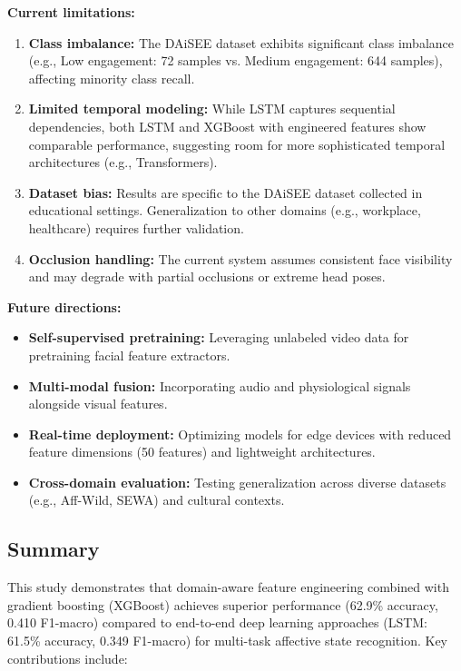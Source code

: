 \textbf{Current limitations:}
\begin{enumerate}
    \item \textbf{Class imbalance:} The DAiSEE dataset exhibits significant class imbalance (e.g., Low engagement: 72 samples vs. Medium engagement: 644 samples), affecting minority class recall.
    
    \item \textbf{Limited temporal modeling:} While LSTM captures sequential dependencies, both LSTM and XGBoost with engineered features show comparable performance, suggesting room for more sophisticated temporal architectures (e.g., Transformers).
    
    \item \textbf{Dataset bias:} Results are specific to the DAiSEE dataset collected in educational settings. Generalization to other domains (e.g., workplace, healthcare) requires further validation.
    
    \item \textbf{Occlusion handling:} The current system assumes consistent face visibility and may degrade with partial occlusions or extreme head poses.
\end{enumerate}

\textbf{Future directions:}
\begin{itemize}
    \item \textbf{Self-supervised pretraining:} Leveraging unlabeled video data for pretraining facial feature extractors.
    
    \item \textbf{Multi-modal fusion:} Incorporating audio and physiological signals alongside visual features.
    
    \item \textbf{Real-time deployment:} Optimizing models for edge devices with reduced feature dimensions (50 features) and lightweight architectures.
    
    \item \textbf{Cross-domain evaluation:} Testing generalization across diverse datasets (e.g., Aff-Wild, SEWA) and cultural contexts.
\end{itemize}

\subsection{Summary}
\label{subsec:summary}

This study demonstrates that domain-aware feature engineering combined with gradient boosting (XGBoost) achieves superior performance (62.9\% accuracy, 0.410 F1-macro) compared to end-to-end deep learning approaches (LSTM: 61.5\% accuracy, 0.349 F1-macro) for multi-task affective state recognition. Key contributions include:

